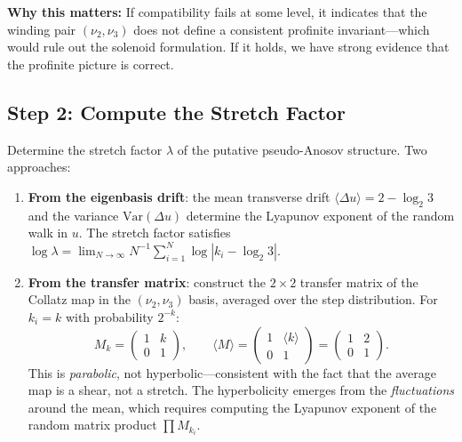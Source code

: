 \documentclass[11pt,a4paper]{article}
\theoremstyle{plain}
\theoremstyle{definition}
\begin{document}
\noindent\textbf{Why this matters:} If compatibility fails at some level, it indicates that the winding pair $(\nu_2, \nu_3)$ does not define a consistent profinite invariant---which would rule out the solenoid formulation. If it holds, we have strong evidence that the profinite picture is correct.


\subsection{Step 2: Compute the Stretch Factor}

\begin{nextstep}
Determine the stretch factor $\lambda$ of the putative pseudo-Anosov structure. Two approaches:
\begin{enumerate}[label=(\alph*)]
    \item \textbf{From the eigenbasis drift}: the mean transverse drift $\langle \Delta u \rangle = 2 - \log_2 3$ and the variance $\mathrm{Var}(\Delta u)$ determine the Lyapunov exponent of the random walk in $u$. The stretch factor satisfies $\log \lambda = \lim_{N \to \infty} N^{-1} \sum_{i=1}^{N} \log |k_i - \log_2 3|$.

    \item \textbf{From the transfer matrix}: construct the $2 \times 2$ transfer matrix of the Collatz map in the $(\nu_2, \nu_3)$ basis, averaged over the step distribution. For $k_i = k$ with probability $2^{-k}$:
    \begin{equation}
        M_k = \begin{pmatrix} 1 & k \\ 0 & 1 \end{pmatrix}, \qquad
        \langle M \rangle = \begin{pmatrix} 1 & \langle k \rangle \\ 0 & 1 \end{pmatrix} = \begin{pmatrix} 1 & 2 \\ 0 & 1 \end{pmatrix}.
    \end{equation}
    This is \emph{parabolic}, not hyperbolic---consistent with the fact that the average map is a shear, not a stretch. The hyperbolicity emerges from the \emph{fluctuations} around the mean, which requires computing the Lyapunov exponent of the random matrix product $\prod M_{k_i}$.
\end{enumerate}
\end{nextstep}
\end{document}
